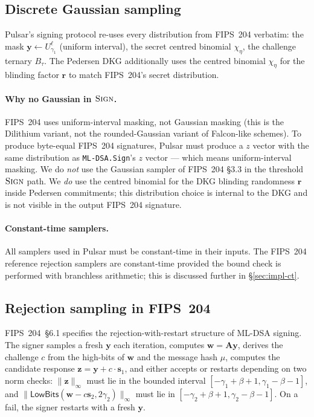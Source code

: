 \documentclass[11pt,a4paper]{article}
\theoremstyle{definition}
\theoremstyle{remark}
\newcommand{\LowBits}{\mathsf{LowBits}}
\newcommand{\Sign}{\textsc{Sign}}
\begin{document}
\subsection{Discrete Gaussian sampling}
\label{sec:prelim-gauss}

Pulsar's signing protocol re-uses every distribution from FIPS~204
verbatim: the mask $\mathbf{y} \gets U_{\gamma_1}^\ell$ (uniform interval),
the secret centred binomial $\chi_\eta$, the challenge ternary
$B_\tau$. The Pedersen DKG additionally uses the centred binomial
$\chi_\eta$ for the blinding factor $\mathbf{r}$ to match
FIPS~204's secret distribution.

\paragraph{Why no Gaussian in $\Sign$.}
FIPS~204 uses uniform-interval masking, not Gaussian masking (this is
the Dilithium variant, not the rounded-Gaussian variant of
Falcon-like schemes). To produce byte-equal FIPS~204 signatures,
Pulsar must produce a $z$ vector with the same distribution as
\texttt{ML-DSA.Sign}'s $z$ vector --- which means uniform-interval
masking. We do \emph{not} use the Gaussian sampler of FIPS~204 \S3.3
in the threshold $\Sign$ path. We \emph{do} use the centred binomial
for the DKG blinding randomness $\mathbf{r}$ inside Pedersen
commitments; this distribution choice is internal to the DKG and is
not visible in the output FIPS~204 signature.

\paragraph{Constant-time samplers.}
All samplers used in Pulsar must be constant-time in their inputs.
The FIPS~204 reference rejection samplers are constant-time provided
the bound check is performed with branchless arithmetic; this is
discussed further in \S\ref{sec:impl-ct}.

\subsection{Rejection sampling in FIPS~204}
\label{sec:prelim-rejection}

FIPS~204~\S6.1 specifies the rejection-with-restart structure of
ML-DSA signing. The signer samples a fresh $\mathbf{y}$ each
iteration, computes $\mathbf{w} = \mathbf{A}\mathbf{y}$, derives the
challenge $c$ from the high-bits of $\mathbf{w}$ and the message
hash $\mu$, computes the candidate response
$\mathbf{z} = \mathbf{y} + c \cdot \mathbf{s}_1$, and either accepts
or restarts depending on two norm checks: $\|\mathbf{z}\|_\infty$
must lie in the bounded interval
$[-\gamma_1 + \beta + 1, \gamma_1 - \beta - 1]$, and
$\|\LowBits(\mathbf{w} - c\mathbf{s}_2, 2\gamma_2)\|_\infty$ must lie
in $[-\gamma_2 + \beta + 1, \gamma_2 - \beta - 1]$. On a fail, the
signer restarts with a fresh $\mathbf{y}$.
\end{document}
